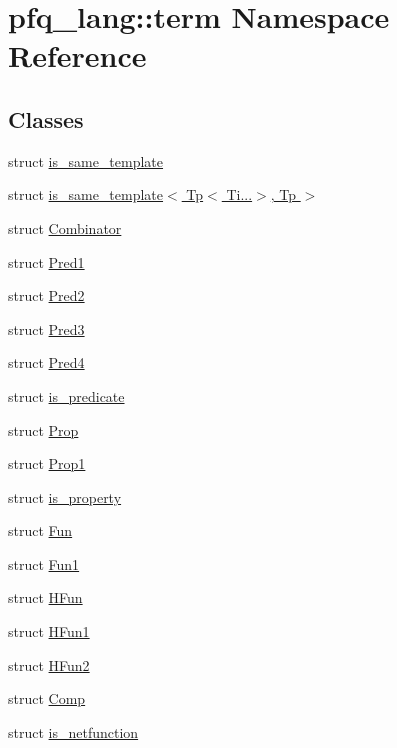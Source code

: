 \hypertarget{namespacepfq__lang_1_1term}{\section{pfq\-\_\-lang\-:\-:term Namespace Reference}
\label{namespacepfq__lang_1_1term}
}
\subsection*{Classes}
\begin{DoxyCompactItemize}
\item 
struct \hyperlink{structpfq__lang_1_1term_1_1is__same__template}{is\-\_\-same\-\_\-template}
\item 
struct \hyperlink{structpfq__lang_1_1term_1_1is__same__template_3_01Tp_3_01Ti_8_8_8_4_00_01Tp_01_4}{is\-\_\-same\-\_\-template$<$ Tp$<$ Ti...$>$, Tp $>$}
\item 
struct \hyperlink{structpfq__lang_1_1term_1_1Combinator}{Combinator}
\item 
struct \hyperlink{structpfq__lang_1_1term_1_1Pred1}{Pred1}
\item 
struct \hyperlink{structpfq__lang_1_1term_1_1Pred2}{Pred2}
\item 
struct \hyperlink{structpfq__lang_1_1term_1_1Pred3}{Pred3}
\item 
struct \hyperlink{structpfq__lang_1_1term_1_1Pred4}{Pred4}
\item 
struct \hyperlink{structpfq__lang_1_1term_1_1is__predicate}{is\-\_\-predicate}
\item 
struct \hyperlink{structpfq__lang_1_1term_1_1Prop}{Prop}
\item 
struct \hyperlink{structpfq__lang_1_1term_1_1Prop1}{Prop1}
\item 
struct \hyperlink{structpfq__lang_1_1term_1_1is__property}{is\-\_\-property}
\item 
struct \hyperlink{structpfq__lang_1_1term_1_1Fun}{Fun}
\item 
struct \hyperlink{structpfq__lang_1_1term_1_1Fun1}{Fun1}
\item 
struct \hyperlink{structpfq__lang_1_1term_1_1HFun}{H\-Fun}
\item 
struct \hyperlink{structpfq__lang_1_1term_1_1HFun1}{H\-Fun1}
\item 
struct \hyperlink{structpfq__lang_1_1term_1_1HFun2}{H\-Fun2}
\item 
struct \hyperlink{structpfq__lang_1_1term_1_1Comp}{Comp}
\item 
struct \hyperlink{structpfq__lang_1_1term_1_1is__netfunction}{is\-\_\-netfunction}
\end{DoxyCompactItemize}
